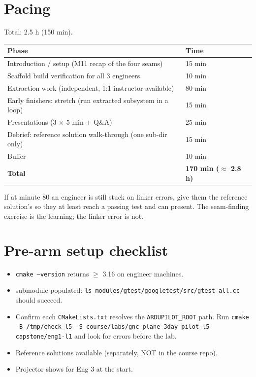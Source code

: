 \documentclass[a4paper,11pt,twoside]{article}
\renewcommand{\insttiming}[1]{\ifinstructor\begin{tcolorbox}[colback=orange!5!white,colframe=orange!50!black,title=Pacing,breakable]#1\end{tcolorbox}\fi}
\begin{document}
\section*{Pacing}

Total: 2.5 h (150 min).

\begin{center}\small
\begin{tabular}{|p{6cm}|p{4cm}|}\hline
\textbf{Phase} & \textbf{Time} \\ \hline
Introduction / setup (M11 recap of the four seams) & 15 min \\ \hline
Scaffold build verification for all 3 engineers & 10 min \\ \hline
Extraction work (independent, 1:1 instructor available) & 80 min \\ \hline
Early finishers: stretch (run extracted subsystem in a loop) & 15 min \\ \hline
Presentations (3 $\times$ 5 min + Q\&A) & 25 min \\ \hline
Debrief: reference solution walk-through (one sub-dir only) & 15 min \\ \hline
Buffer & 10 min \\ \hline
\textbf{Total} & \textbf{170 min ($\approx$ 2.8 h)} \\ \hline
\end{tabular}
\end{center}

\insttiming{If at minute 80 an engineer is still stuck on linker errors, give them the reference solution's \codepath{stubs.cpp} so they at least reach a passing test and can present. The seam-finding exercise is the learning; the linker error is not.}

\section*{Pre-arm setup checklist}

\begin{itemize}[label={[ ]}]
  \item \texttt{cmake --version} returns $\geq$ 3.16 on engineer machines.
  \item {} submodule populated: \texttt{ls modules/gtest/googletest/src/gtest-all.cc} should succeed.
  \item Confirm each \texttt{CMakeLists.txt} resolves the \texttt{ARDUPILOT\_ROOT} path. Run \texttt{cmake -B /tmp/check\_l5 -S course/labs/gnc-plane-3day-pilot-l5-capstone/eng1-l1} and look for errors before the lab.
  \item Reference solutions available (separately, NOT in the course repo).
  \item Projector shows  for Eng 3 at the start.
\end{itemize}
\end{document}
